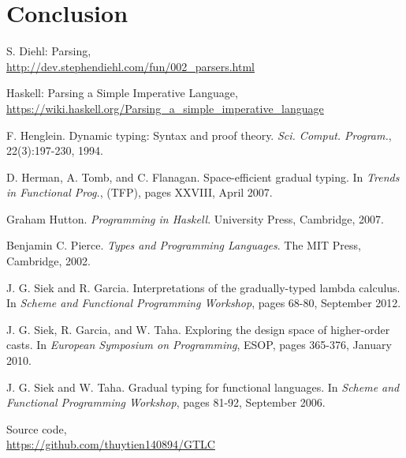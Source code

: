 \documentclass[11pt]{article}
\begin{document}
\section{Conclusion} 

\appendix


\begin{thebibliography}{9}
    S. Diehl:  Parsing, \\
    \url{http://dev.stephendiehl.com/fun/002_parsers.html}

    Haskell: Parsing a Simple Imperative Language, \\
    \url{https://wiki.haskell.org/Parsing_a_simple_imperative_language}

    F. Henglein.
    Dynamic typing: Syntax and proof theory. 
    \textit{Sci. Comput. Program.},
    22(3):197-230, 1994.

    D. Herman, A. Tomb, and C. Flanagan. 
    Space-efficient gradual typing. 
    In \textit{Trends in Functional Prog.}, (TFP),
    pages XXVIII, April 2007.

    Graham Hutton. 
    \textit{Programming in Haskell}. 
    University Press, Cambridge, 2007.

    Benjamin C. Pierce. 
    \textit{Types and Programming Languages}. 
    The MIT Press, Cambridge, 2002.

    J. G. Siek and R. Garcia. 
    Interpretations of the gradually-typed lambda calculus. 
    In \textit{Scheme and Functional Programming Workshop}, 
    pages 68-80, September 2012.

    J. G. Siek, R. Garcia, and W. Taha. 
    Exploring the design space of higher-order casts. 
    In \textit{European Symposium on Programming}, ESOP,
    pages 365-376, January 2010.

    J. G. Siek and W. Taha. 
    Gradual typing for functional languages. 
    In \textit{Scheme and Functional Programming Workshop}, pages 81-92, September 2006.

    Source code, \\
    \url{https://github.com/thuytien140894/GTLC}
\end{thebibliography}
\end{document}
